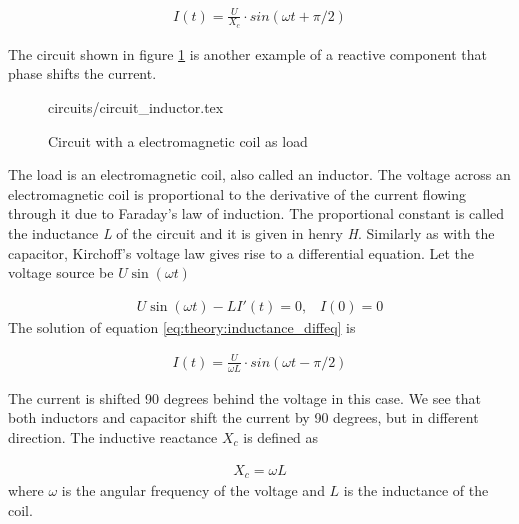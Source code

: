 \documentclass[class=book, crop=false]{standalone}
\begin{document}
\begin{equation}
   \begin{aligned}\label{eq:theory:capacitance_diffeq_solved_ohm}
I(t) = \frac{U}{X_{c}} \cdot sin(\omega t + \pi/2)
\end{aligned} 
\end{equation}

The circuit shown in figure \ref{fig:theory:circuit_inductor} is another example of a reactive component that phase shifts the current. 

\begin{figure}[ht!]
    \center
    {circuits/circuit_inductor.tex}
    \caption[size = 9]
    {Circuit with a electromagnetic coil as load}\label{fig:theory:circuit_inductor}
\end{figure}

The load is an electromagnetic coil, also called an inductor. The voltage  across an electromagnetic coil is proportional to the derivative of the current flowing through it due to Faraday's law of induction. The proportional constant is called the inductance \textit{L} of the circuit and it is given in henry \textit{H}. Similarly as with the capacitor, Kirchoff's voltage law  gives rise to a differential equation. Let the voltage source be $U\sin{(\omega t)}$

\begin{equation}
   \begin{aligned}\label{eq:theory:inductance_diffeq}
U\sin{(\omega t)} - LI'(t) = 0, \;\;\; I(0) = 0
\end{aligned} 
\end{equation}
The solution of equation \eqref{eq:theory:inductance_diffeq} is

\begin{equation}
   \begin{aligned}\label{eq:theory:inductancee_diffeq_solved}
I(t) = \frac{U}{\omega L} \cdot sin(\omega t - \pi/2)
\end{aligned} 
\end{equation}


The current is shifted 90 degrees behind the voltage in this case. We see that both inductors and capacitor shift the current by 90 degrees, but in different direction. The inductive reactance $X_{c}$ is defined as

\begin{equation}
   \begin{aligned}\label{eq:theory:reactance_inductive}
X_{c} = \omega L
\end{aligned} 
\end{equation}
where $\omega$ is the angular frequency of the voltage and $L$ is the inductance of the coil. 
\end{document}
